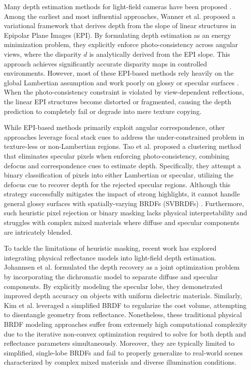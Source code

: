 \documentclass[lettersize,journal]{IEEEtran}
\begin{document}
Many depth estimation methods for light-field cameras have been proposed \cite{lightfielddepthestimationE}. Among the earliest and most influential approaches, Wanner et al. \cite{Wannergloballyconsistentdep} proposed a variational framework that derives depth from the slope of linear structures in Epipolar Plane Images (EPI). By formulating depth estimation as an energy minimization problem, they explicitly enforce photo-consistency across angular views, where the disparity $d$ is analytically derived from the EPI slope. This approach achieves significantly accurate disparity maps in controlled environments. However, most of these EPI-based methods rely heavily on the global Lambertian assumption and work poorly on glossy or specular surfaces \cite{Lambertianassumptionglossys}. When the photo-consistency constraint is violated by view-dependent reflections, the linear EPI structures become distorted or fragmented, causing the depth prediction to completely fail or degrade into mere texture copying.

While EPI-based methods primarily exploit angular correspondence, other approaches leverage focal stack cues to address the under-constrained problem in texture-less or non-Lambertian regions. Tao et al. \cite{Taodepthfromcombiningdefoc} proposed a clustering method that eliminates specular pixels when enforcing photo-consistency, combining defocus and correspondence cues to estimate depth. Specifically, they attempt a binary classification of pixels into either Lambertian or specular, utilizing the defocus cue to recover depth for the rejected specular regions. Although this strategy successfully mitigates the impact of strong highlights, it cannot handle general glossy surfaces with spatially-varying BRDFs (SVBRDFs) \cite{spatiallyvaryingBRDFsglossy}. Furthermore, such heuristic pixel rejection or binary masking lacks physical interpretability and struggles with complex mixed materials where diffuse and specular components are intricately blended.

To tackle the limitations of heuristic masking, recent work has explored integrating physical reflectance models into light-field depth estimation. Johannsen et al. \cite{Johannsendepthestimationand} formulated the depth recovery as a joint optimization problem by incorporating the dichromatic model to separate diffuse and specular components. By explicitly modeling the specular lobe, they demonstrated improved depth accuracy on objects with uniform dielectric materials. Similarly, Kim et al. \cite{KimdepthestimationofnonLa} leveraged a simplified BRDF to regularize the cost volume, attempting to disentangle geometry from reflectance. Nonetheless, these traditional physical BRDF modeling approaches suffer from extremely high computational complexity due to the iterative non-convex optimization required to solve for both depth and reflectance parameters simultaneously. Moreover, they are typically limited to simplified, single-lobe BRDFs and fail to properly generalize to real-world scenes characterized by complex mixed materials and diverse illumination conditions.
\end{document}
